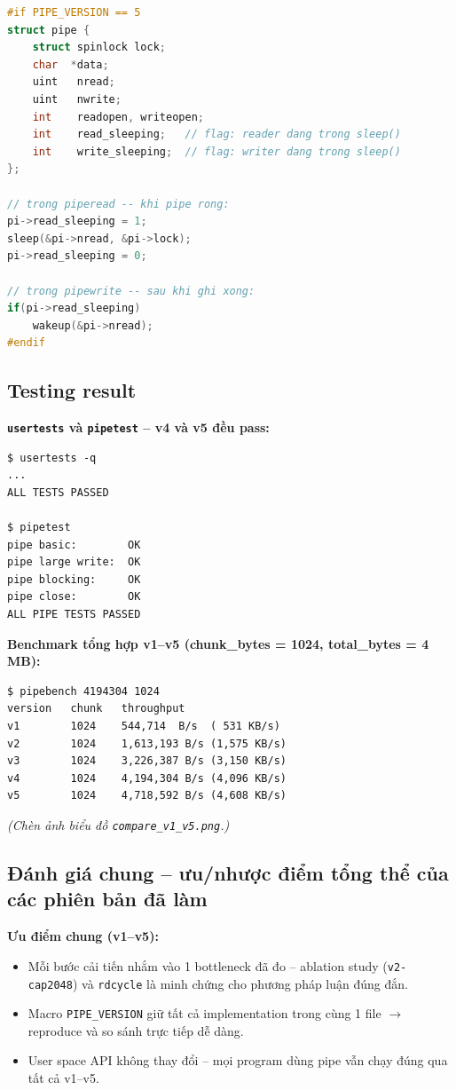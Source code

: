 \documentclass[11pt,a4paper]{article}
\begin{document}
\begin{lstlisting}[language=C]
#if PIPE_VERSION == 5
struct pipe {
    struct spinlock lock;
    char  *data;
    uint   nread;
    uint   nwrite;
    int    readopen, writeopen;
    int    read_sleeping;   // flag: reader dang trong sleep()
    int    write_sleeping;  // flag: writer dang trong sleep()
};

// trong piperead -- khi pipe rong:
pi->read_sleeping = 1;
sleep(&pi->nread, &pi->lock);
pi->read_sleeping = 0;

// trong pipewrite -- sau khi ghi xong:
if(pi->read_sleeping)
    wakeup(&pi->nread);
#endif
\end{lstlisting}

\subsection{Testing result}

\textbf{\texttt{usertests} và \texttt{pipetest} -- v4 và v5 đều pass:}

\begin{lstlisting}[style=plain]
$ usertests -q
...
ALL TESTS PASSED

$ pipetest
pipe basic:        OK
pipe large write:  OK
pipe blocking:     OK
pipe close:        OK
ALL PIPE TESTS PASSED
\end{lstlisting}

\textbf{Benchmark tổng hợp v1--v5 (chunk\_bytes = 1024, total\_bytes = 4 MB):}

\begin{lstlisting}[style=plain]
$ pipebench 4194304 1024
version   chunk   throughput
v1        1024    544,714  B/s  ( 531 KB/s)
v2        1024    1,613,193 B/s (1,575 KB/s)
v3        1024    3,226,387 B/s (3,150 KB/s)
v4        1024    4,194,304 B/s (4,096 KB/s)
v5        1024    4,718,592 B/s (4,608 KB/s)
\end{lstlisting}

\textit{(Chèn ảnh biểu đồ \texttt{compare\_v1\_v5.png}.)}

\subsection{Đánh giá chung -- ưu/nhược điểm tổng thể của các phiên bản đã làm}

\textbf{Ưu điểm chung (v1--v5):}
\begin{itemize}
  \item Mỗi bước cải tiến nhắm vào 1 bottleneck đã đo -- ablation study (\texttt{v2-cap2048}) và \texttt{rdcycle} là minh chứng cho phương pháp luận đúng đắn.
  \item Macro \texttt{PIPE\_VERSION} giữ tất cả implementation trong cùng 1 file $\rightarrow$ reproduce và so sánh trực tiếp dễ dàng.
  \item User space API không thay đổi -- mọi program dùng pipe vẫn chạy đúng qua tất cả v1--v5.
\end{itemize}
\end{document}
